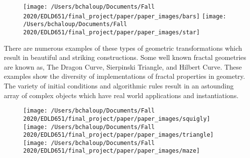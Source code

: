 \documentclass[english,jou]{apa6}
\begin{document}
\begin{figure}

\texttt{[image: /Users/bchaloup/Documents/Fall 2020/EDLD651/final\_project/paper/paper\_images/bars]} \texttt{[image: /Users/bchaloup/Documents/Fall 2020/EDLD651/final\_project/paper/paper\_images/star]} \hfill{}

\caption{ }\label{fig:unnamed-chunk-2}
\end{figure}

There are numerous examples of these types of geometric transformations which result in beautiful and striking constructions. Some well known fractal geometries are known as, The Dragon Curve, Sierpinski Triangle, and Hilbert Curve. These examples show the diversity of implementations of fractal properties in geometry. The variety of initial conditions and algorithmic rules result in an astounding array of complex objects which have real world applications and instantiations.

\begin{figure}

\texttt{[image: /Users/bchaloup/Documents/Fall 2020/EDLD651/final\_project/paper/paper\_images/squigly]} \texttt{[image: /Users/bchaloup/Documents/Fall 2020/EDLD651/final\_project/paper/paper\_images/triangle]} \texttt{[image: /Users/bchaloup/Documents/Fall 2020/EDLD651/final\_project/paper/paper\_images/maze]} \hfill{}

\caption{ }\label{fig:unnamed-chunk-3}
\end{figure}
\end{document}

